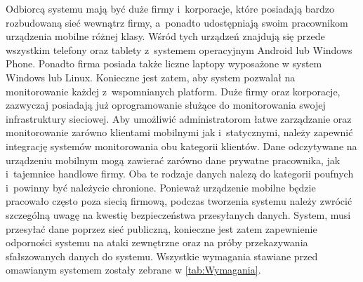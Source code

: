 Odbiorcą systemu mają być duże firmy i~korporacje, które posiadają
bardzo rozbudowaną sieć wewnątrz firmy, a~ponadto udostępniają swoim
pracownikom urządzenia mobilne różnej klasy. Wśród tych urządzeń
znajdują się przede wszystkim telefony oraz tablety z~systemem
operacyjnym Android lub Windows Phone. Ponadto firma posiada także
liczne laptopy wyposażone w system Windows lub Linux. Konieczne jest
zatem, aby system pozwalał na monitorowanie każdej z~wspomnianych
platform. Duże firmy oraz korporacje, zazwyczaj posiadają już
oprogramowanie służące do monitorowania swojej infrastruktury
sieciowej. Aby umożliwić administratorom łatwe zarządzanie oraz
monitorowanie zarówno klientami mobilnymi jak i~statycznymi, należy
zapewnić integrację systemów monitorowania obu kategorii
klientów. Dane odczytywane na urządzeniu mobilnym mogą zawierać
zarówno dane prywatne pracownika, jak i~tajemnice handlowe firmy. Oba
te rodzaje danych nalezą do kategorii poufnych i~powinny być należycie
chronione. Ponieważ urządzenie mobilne będzie pracowało często poza
siecią firmową, podczas tworzenia systemu należy zwrócić szczególną
uwagę na kwestię bezpieczeństwa przesyłanych danych. System, musi
przesyłać dane poprzez sieć publiczną, konieczne jest zatem
zapewnienie odporności systemu na ataki zewnętrzne oraz na próby
przekazywania sfałszowanych danych do systemu. Wszystkie wymagania
stawiane przed omawianym systemem zostały zebrane w
\ref{tab:Wymagania}.

